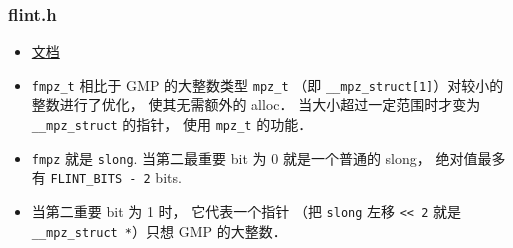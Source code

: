 
\begin{issues}
\issueDraft
\end{issues}


\subsubsection{flint.h}
\begin{itemize}
\item \href{http://flintlib.org/sphinx/fmpz.html}{文档}
\item \verb|fmpz_t| 相比于 GMP 的大整数类型 \verb|mpz_t| （即 \verb|__mpz_struct[1]|）对较小的整数进行了优化， 使其无需额外的 alloc． 当大小超过一定范围时才变为 \verb|__mpz_struct| 的指针， 使用 \verb|mpz_t| 的功能．
\item \verb|fmpz| 就是 \verb|slong|. 当第二最重要 bit 为 0 就是一个普通的 slong， 绝对值最多有 \verb|FLINT_BITS - 2| bits.
\item 当第二重要 bit 为 1 时， 它代表一个指针 （把 \verb|slong| 左移 \verb|<< 2| 就是 \verb|__mpz_struct *|）只想 GMP 的大整数．
\end{itemize}
